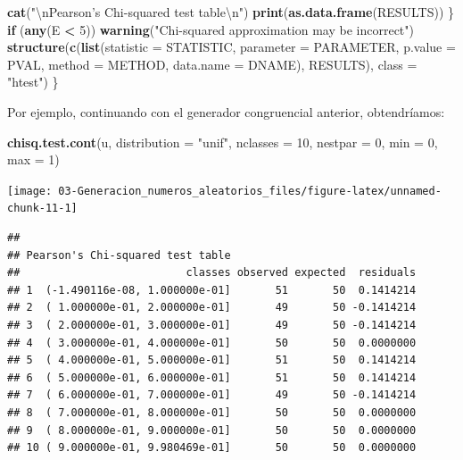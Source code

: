 \documentclass[]{book}
\newenvironment{Shaded}{\begin{snugshade}}{\end{snugshade}}
\newcommand{\KeywordTok}[1]{\textcolor[rgb]{0.13,0.29,0.53}{\textbf{#1}}}
\newcommand{\DataTypeTok}[1]{\textcolor[rgb]{0.13,0.29,0.53}{#1}}
\newcommand{\DecValTok}[1]{\textcolor[rgb]{0.00,0.00,0.81}{#1}}
\newcommand{\CharTok}[1]{\textcolor[rgb]{0.31,0.60,0.02}{#1}}
\newcommand{\StringTok}[1]{\textcolor[rgb]{0.31,0.60,0.02}{#1}}
\newcommand{\ControlFlowTok}[1]{\textcolor[rgb]{0.13,0.29,0.53}{\textbf{#1}}}
\newcommand{\OperatorTok}[1]{\textcolor[rgb]{0.81,0.36,0.00}{\textbf{#1}}}
\newcommand{\NormalTok}[1]{#1}
\theoremstyle{definition}
\theoremstyle{definition}
\theoremstyle{definition}
\theoremstyle{remark}
\begin{document}
\begin{Shaded}
\begin{Highlighting}[]
        \KeywordTok{cat}\NormalTok{(}\StringTok{"}\CharTok{\textbackslash{}n}\StringTok{Pearson's Chi-squared test table}\CharTok{\textbackslash{}n}\StringTok{"}\NormalTok{)}
        \KeywordTok{print}\NormalTok{(}\KeywordTok{as.data.frame}\NormalTok{(RESULTS))}
\NormalTok{    \}}
    \ControlFlowTok{if}\NormalTok{ (}\KeywordTok{any}\NormalTok{(E }\OperatorTok{<}\StringTok{ }\DecValTok{5}\NormalTok{)) }
        \KeywordTok{warning}\NormalTok{(}\StringTok{"Chi-squared approximation may be incorrect"}\NormalTok{)}
    \KeywordTok{structure}\NormalTok{(}\KeywordTok{c}\NormalTok{(}\KeywordTok{list}\NormalTok{(}\DataTypeTok{statistic =}\NormalTok{ STATISTIC, }\DataTypeTok{parameter =}\NormalTok{ PARAMETER, }\DataTypeTok{p.value =}\NormalTok{ PVAL, }
        \DataTypeTok{method =}\NormalTok{ METHOD, }\DataTypeTok{data.name =}\NormalTok{ DNAME), RESULTS), }\DataTypeTok{class =} \StringTok{"htest"}\NormalTok{)}
\NormalTok{\}}
\end{Highlighting}
\end{Shaded}

Por ejemplo, continuando con el generador congruencial anterior,
obtendríamos:

\begin{Shaded}
\begin{Highlighting}[]
\KeywordTok{chisq.test.cont}\NormalTok{(u, }\DataTypeTok{distribution =} \StringTok{"unif"}\NormalTok{, }
                \DataTypeTok{nclasses =} \DecValTok{10}\NormalTok{, }\DataTypeTok{nestpar =} \DecValTok{0}\NormalTok{, }\DataTypeTok{min =} \DecValTok{0}\NormalTok{, }\DataTypeTok{max =} \DecValTok{1}\NormalTok{)}
\end{Highlighting}
\end{Shaded}

\begin{center}\texttt{[image: 03-Generacion\_numeros\_aleatorios\_files/figure-latex/unnamed-chunk-11-1]} \end{center}

\begin{verbatim}
## 
## Pearson's Chi-squared test table
##                          classes observed expected  residuals
## 1  (-1.490116e-08, 1.000000e-01]       51       50  0.1414214
## 2  ( 1.000000e-01, 2.000000e-01]       49       50 -0.1414214
## 3  ( 2.000000e-01, 3.000000e-01]       49       50 -0.1414214
## 4  ( 3.000000e-01, 4.000000e-01]       50       50  0.0000000
## 5  ( 4.000000e-01, 5.000000e-01]       51       50  0.1414214
## 6  ( 5.000000e-01, 6.000000e-01]       51       50  0.1414214
## 7  ( 6.000000e-01, 7.000000e-01]       49       50 -0.1414214
## 8  ( 7.000000e-01, 8.000000e-01]       50       50  0.0000000
## 9  ( 8.000000e-01, 9.000000e-01]       50       50  0.0000000
## 10 ( 9.000000e-01, 9.980469e-01]       50       50  0.0000000
\end{verbatim}
\end{document}
